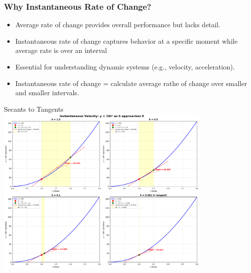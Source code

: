 \documentclass{beamer}
\begin{document}
\begin{frame}
\frametitle{Why Instantaneous Rate of Change?}
\begin{itemize}
  \item Average rate of change provides overall performance but lacks detail.
  \item Instantaneous rate of change captures behavior at a specific moment while average rate is over an interval
  \item Essential for understanding dynamic systems (e.g., velocity, acceleration).
  \item Instantaneous rate of change = calculate average rathe of change over smaller and smaller intervals.
\end{itemize}
\end{frame}
\begin{frame}{Secants to Tangents}
  \centering
  \includegraphics[width=0.8\textwidth]{figures/instantaneous_rate_change.png}
\end{frame}
\end{document}

